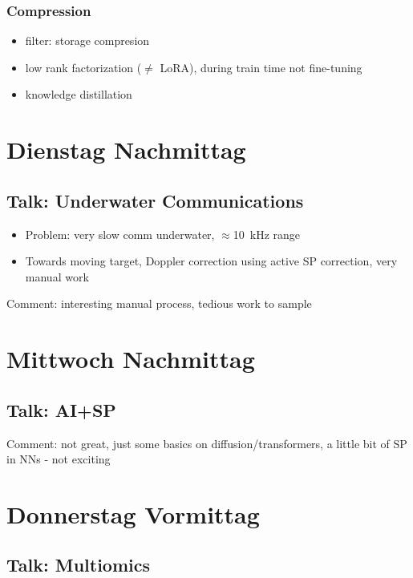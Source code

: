 \documentclass[a4paper]{article}
\begin{document}
\subsubsection{Compression}
\begin{itemize}
    \item filter: storage compresion
    \item low rank factorization ($\neq$ LoRA), during train time not fine-tuning
    \item knowledge distillation
\end{itemize}

\section{Dienstag Nachmittag}

\subsection{Talk: Underwater Communications}

\begin{itemize}
    \item Problem: very slow comm underwater, $\approx$10~kHz range
    \item Towards moving target, Doppler correction using active SP correction, very manual work
\end{itemize}
Comment: interesting manual process, tedious work to sample


\section{Mittwoch Nachmittag}

\subsection{Talk: AI+SP}
Comment: not great, just some basics on diffusion/transformers, a little bit of SP in NNs - not exciting


\section{Donnerstag Vormittag}

\subsection{Talk: Multiomics}
\end{document}
